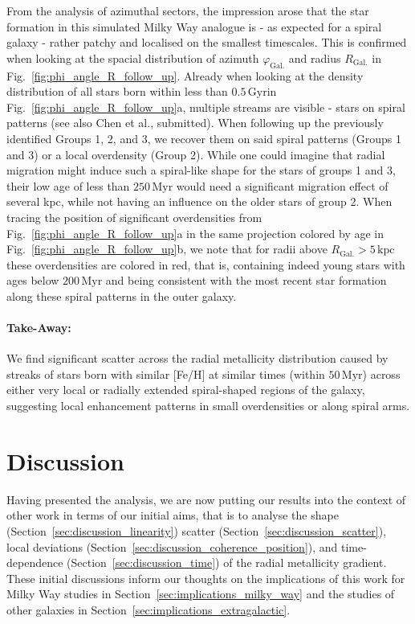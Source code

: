\documentclass[fleqn,usenatbib]{mnras}
\newcommand{\nihaoAGEmax}{$0.5\,\mathrm{Gyr}$}
\begin{document}
From the analysis of azimuthal sectors, the impression arose that the star formation in this simulated Milky Way analogue is - as expected for a spiral galaxy - rather patchy and localised on the smallest timescales. This is confirmed when looking at the spacial distribution of azimuth $\varphi_\mathrm{Gal.}$ and radius $R_\mathrm{Gal.}$ in Fig.~\ref{fig:phi_angle_R_follow_up}. Already when looking at the density distribution of all stars born within less than \nihaoAGEmax in Fig.~\ref{fig:phi_angle_R_follow_up}a, multiple streams are visible - stars on spiral patterns (see also Chen et al., submitted). When following up the previously identified Groups 1, 2, and 3, we recover them on said spiral patterns (Groups 1 and 3) or a local overdensity (Group 2). While one could imagine that radial migration might induce such a spiral-like shape for the stars of groups 1 and 3, their low age of less than $250\,\mathrm{Myr}$ would need a significant migration effect of several kpc, while not having an influence on the older stars of group 2. When tracing the position of significant overdensities from Fig.~\ref{fig:phi_angle_R_follow_up}a in the same projection colored by age in Fig.~\ref{fig:phi_angle_R_follow_up}b, we note that for radii above $R_\mathrm{Gal.} > 5\,\mathrm{kpc}$ these overdensities are colored in red, that is, containing indeed young stars with ages below $200\,\mathrm{Myr}$ and being consistent with the most recent star formation along these spiral patterns in the outer galaxy.

\paragraph*{Take-Away:} We find significant scatter across the radial metallicity distribution caused by streaks of stars born with similar [Fe/H] at similar times (within $50\,\mathrm{Myr}$) across either very local or radially extended spiral-shaped regions of the galaxy, suggesting local enhancement patterns in small overdensities or along spiral arms.

\section{Discussion} \label{sec:discussion}

Having presented the analysis, we are now putting our results into the context of other work in terms of our initial aims, that is to analyse the shape (Section~\ref{sec:discussion_linearity}) scatter (Section~\ref{sec:discussion_scatter}), local deviations (Section~\ref{sec:discussion_coherence_position}), and time-dependence (Section~\ref{sec:discussion_time}) of the radial metallicity gradient. These initial discussions inform our thoughts on the implications of this work for Milky Way studies in Section~\ref{sec:implications_milky_way} and the studies of other galaxies in Section~\ref{sec:implications_extragalactic}.
\end{document}
